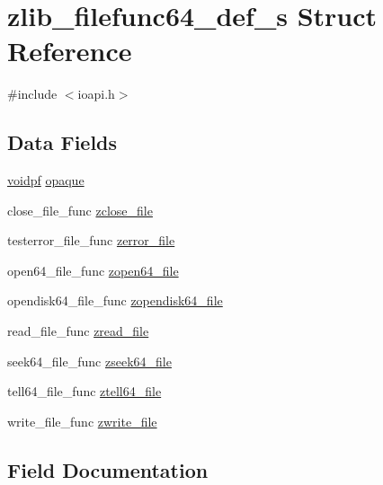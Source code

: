 \hypertarget{structzlib__filefunc64__def__s}{}\section{zlib\+\_\+filefunc64\+\_\+def\+\_\+s Struct Reference}
\label{structzlib__filefunc64__def__s}


{\ttfamily \#include $<$ioapi.\+h$>$}

\subsection*{Data Fields}
\begin{DoxyCompactItemize}
\item 
\hyperlink{ioapi_8h_a39ab6d73c1cd44bc17064c2dcbb3e753}{voidpf} \hyperlink{structzlib__filefunc64__def__s_a5f6d2267b03488a9edc3fdd9a2da0c2f}{opaque}
\item 
close\+\_\+file\+\_\+func \hyperlink{structzlib__filefunc64__def__s_aaf7d9825e2afc16c93cec9956c4f1a10}{zclose\+\_\+file}
\item 
testerror\+\_\+file\+\_\+func \hyperlink{structzlib__filefunc64__def__s_abdac5e81672673ef1f4242d6fdc49d2d}{zerror\+\_\+file}
\item 
open64\+\_\+file\+\_\+func \hyperlink{structzlib__filefunc64__def__s_a53df1c67f9b44a61e607b9cfb9c409c0}{zopen64\+\_\+file}
\item 
opendisk64\+\_\+file\+\_\+func \hyperlink{structzlib__filefunc64__def__s_a42d6f4d988510f51b74ac74019eb191c}{zopendisk64\+\_\+file}
\item 
read\+\_\+file\+\_\+func \hyperlink{structzlib__filefunc64__def__s_a5fd1cd36c741000649328d0db54523c5}{zread\+\_\+file}
\item 
seek64\+\_\+file\+\_\+func \hyperlink{structzlib__filefunc64__def__s_ab03b3242d363b748ea6e60b7b9e5e6d1}{zseek64\+\_\+file}
\item 
tell64\+\_\+file\+\_\+func \hyperlink{structzlib__filefunc64__def__s_a88b8bd0d697c49e384915fcab765b5b3}{ztell64\+\_\+file}
\item 
write\+\_\+file\+\_\+func \hyperlink{structzlib__filefunc64__def__s_a04f5366c9e7e48343357bb88b46998f9}{zwrite\+\_\+file}
\end{DoxyCompactItemize}


\subsection{Field Documentation}
\mbox{\label{structzlib__filefunc64__def__s_a5f6d2267b03488a9edc3fdd9a2da0c2f}} 

